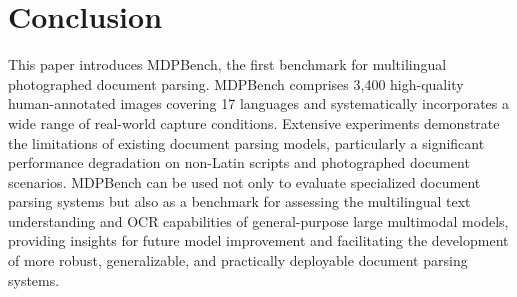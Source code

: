 \documentclass[runningheads]{llncs}
\begin{document}
\section{Conclusion}
This paper introduces MDPBench, the first benchmark for multilingual photographed document parsing. MDPBench comprises 3,400 high-quality human-annotated images covering 17 languages and systematically incorporates a wide range of real-world capture conditions. Extensive experiments demonstrate the limitations of existing document parsing models, particularly a significant performance degradation on non-Latin scripts and photographed document scenarios. MDPBench can be used not only to evaluate specialized document parsing systems but also as a benchmark for assessing the multilingual text understanding and OCR capabilities of general-purpose large multimodal models, providing insights for future model improvement and facilitating the development of more robust, generalizable, and practically deployable document parsing systems.






\end{document}
